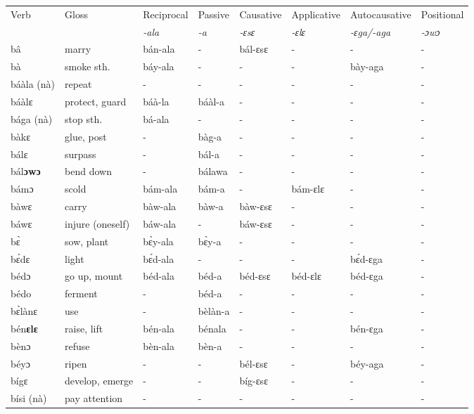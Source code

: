 \begin{sidewaystable}

\begin{longtable}{lp{3.5cm}llllll}
 \midrule
 Verb & Gloss & Reciprocal & Passive  & Causative  & Applicative   & Autocausative & Positional   \\ 
  &    & {\itshape -ala} & {\itshape -a} & {\itshape -ɛsɛ} & {\itshape -ɛlɛ} & {\itshape -ɛga/-aga}  & {\itshape -ɔwɔ}  \\  \midrule \endhead
bâ & marry & bán-ala & - & bál-ɛsɛ & - & - & -  \\
bà & smoke sth. & báy-ala & - & - & - & bày-aga & -  \\
báàla (nà) & repeat & - & - & - & - & - & - \\
báàlɛ & protect, guard & báà-la & báàl-a & - & - & - & - \\
bága (nà) & stop sth. & bá-ala & - & - & - & - & -  \\
bàkɛ & glue, post & - & bàg-a & - & - & - & - \\
bálɛ & surpass & - & bál-a & - & - & - & -  \\
bál{\bfseries ɔwɔ} & bend down & - & bálawa & - & - & - & -  \\
bámɔ & scold & bám-ala & bám-a & - & bám-ɛlɛ & - & -  \\
bàwɛ & carry & bàw-ala & bàw-a & bàw-ɛsɛ & - & - & -  \\
báwɛ & injure (oneself) & báw-ala & - & báw-ɛsɛ & - & - & -  \\  
bɛ̀ & sow, plant & bɛ̀y-ala & bɛ̀y-a & - & - & - & -  \\
bɛ́dɛ & light & bɛ́d-ala & - & - & -  & bɛ́d-ɛga & -  \\
bédɔ & go up, mount & béd-ala & béd-a & béd-ɛsɛ & béd-ɛlɛ &  béd-ɛga & - \\
bédo & ferment & - &  béd-a & - & - & - & - \\
bɛ̀lànɛ & use & - & bèlàn-a & - & - & - & - \\
bén{\bfseries ɛlɛ} & raise, lift & bén-ala & bénala & - & -  & bén-ɛga & - \\
bènɔ & refuse & bèn-ala & bèn-a & - & - & - & - \\
béyɔ & ripen & - & - & bél-ɛsɛ & - & béy-aga & - \\
bígɛ & develop, emerge & - & - & bíg-ɛsɛ & - & - & - \\
bísi (nà) & pay attention & - & - & - & - & - & - \\

\end{longtable}
\end{sidewaystable}
